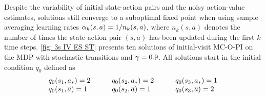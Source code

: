 Despite the variability of initial state-action pairs and the noisy action-value estimates, solutions still converge to a suboptimal fixed point when using sample averaging learning rates $\alpha_k(s,a) = 1/n_k(s,a)$, where $n_k(s,a)$ denotes the number of times the state-action pair $(s,a)$ has been updated during the first $k$ time steps.
\autoref{fig: 3s IV ES ST} presents ten solutions of initial-visit MC-O-PI on the MDP with stochastic transitions and $\gamma = 0.9$.
All solutions start in the initial condition $q_0$ defined as
\vspace{-0.2cm}
\begin{align}
\label{eq: init condition for 3s counter}
\begin{array}{lll}
q_0(s_1, {a}_*) = 2 &\qquad q_0(s_2, {a}_*) = 2 &\qquad q_0(s_3, {a}_*) = 1 \\
q_0(s_1, \overline{a}) = 1 &\qquad q_0(s_2, \overline{a}) = 1 &\qquad q_0(s_3, \overline{a}) = 2
\end{array}
\end{align}








